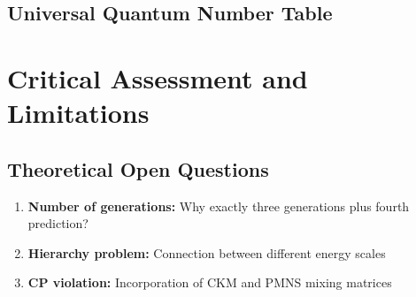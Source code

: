 	\subsection{Universal Quantum Number Table}
	\label{subsec:universal_quantum_table}
	
	\begin{table}[H]
		\centering
		\caption{Complete universal quantum number table for all fermions}
		\label{tab:universal_quantum_numbers}
	\end{table}
	
	\section{Critical Assessment and Limitations}
	\label{sec:critical_assessment}

	\subsection{Theoretical Open Questions}
	\label{subsec:open_questions}
	
	\begin{enumerate}

		\item \textbf{Number of generations:} Why exactly three generations plus fourth prediction?
		\item \textbf{Hierarchy problem:} Connection between different energy scales
		\item \textbf{CP violation:} Incorporation of CKM and PMNS mixing matrices
	\end{enumerate}
	